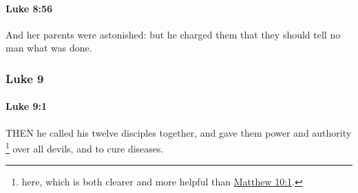 		\paragraph{Luke 8:56} %
			\label{LUKE-8-56}

			And her parents were astonished: but he charged them that they should tell no man what was done.

			\begin{framed}
			\scriptsize
				\begin{compactdesc}
					\item[SBLG] 
				\end{compactdesc}
			\end{framed}

	\subsubsection{Luke 9} %
		\label{LUKE-9}
		
		\paragraph{Luke 9:1} %
			\label{LUKE-9-1}

			THEN he called his twelve disciples together, and gave them power and authority%
				\footnote{%
					 here, which is both clearer and more helpful than \hyperref[MATTHEW-10-1]{Matthew 10:1}.
					}
			over all devils, and to cure diseases.

